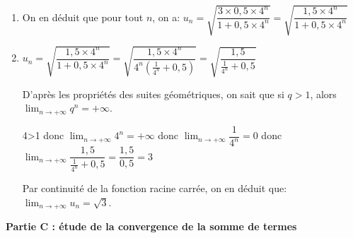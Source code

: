 \documentclass[10pt]{article}
\providecommand{\ds}{\displaystyle}
\begin{document}
\begin{enumerate}
\begin{enumerate}
Donc la suite $(v_n)$ est géométrique de premier terme $v_0=0,5$ et de raison $q=4$.

		\item
{}

On en déduit que pour tout $n$, on a:
$u_n=\sqrt{\dfrac{3\times 0,5 \times 4^n}{1+0,5\times 4^n}}
=\sqrt{\dfrac{1,5 \times 4^n}{1+0,5\times 4^n}}$

		\item
$u_n = \sqrt{\dfrac{1,5 \times 4^n}{1+0,5\times 4^n}} = \sqrt{\dfrac{1,5 \times 4^n}{4^n \left ( \frac{1}{4^n}+0,5\right )}} = \sqrt{\dfrac{1,5}{ \frac{1}{4^n}+0,5}}$		

D'après les propriétés des suites géométriques, on sait que si $q>1$, alors $\ds\lim_{n\to +\infty} q^n=+\infty$.

4>1 donc $\ds\lim_{n\to +\infty}4^n=+\infty$ donc
$\ds\lim_{n\to +\infty} \dfrac{1}{4^n} =0$ donc
$\ds\lim_{n\to +\infty} \dfrac{1,5}{\frac{1}{4^n}+0,5}= \dfrac{1,5}{0,5} = 3$

Par continuité de la fonction racine carrée, on en déduit que: $\ds\lim_{n\to +\infty} u_n=\sqrt{3}$.
	\end{enumerate}
\end{enumerate}

\medskip

\textbf{Partie C : étude de la convergence de la somme de termes}

\medskip
\end{document}
